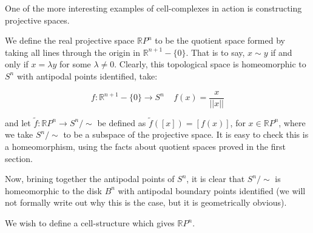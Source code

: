 \documentclass[10pt, oneside]{amsart}
\begin{document}
    One of the more interesting examples of cell-complexes in action is constructing projective spaces.
    \newline

    We define the real projective space $\mathbb{R} P^n$ to be the quotient space formed by taking all lines through the origin in $\mathbb{R}^{n + 1} - \{0\}$.
    That is to say, $x \sim y$ if and only if $x = \lambda y$ for some $\lambda \neq 0$. Clearly, this topological space is homeomorphic to $S^{n}$ with antipodal points identified, take:

    $$f : \mathbb{R}^{n + 1} - \{0\} \rightarrow S^{n} \ \ \ \ \ f(x) = \frac{x}{||x||}$$

    and let $\tilde{f} : \mathbb{R}P^n \rightarrow S^{n}/\sim$ be defined as $\tilde{f}([x]) = [f(x)]$, for $x \in \mathbb{R}P^n$, where we take $S^n/\sim$ to be a subspace of the projective space.
    It is easy to check this is a homeomorphism, using the facts about quotient spaces proved in the first section.
    \newline

    Now, brining together the antipodal points of $S^n$, it is clear that $S^n / \sim$ is homeomorphic to the disk $B^{n}$ with antipodal boundary points identified (we will not formally write out why this
    is the case, but it is geometrically obvious).
    \newline

    We wish to define a cell-structure which gives $\mathbb{R}P^{n}$. 
    
    \hrulefill

    
\end{document}
